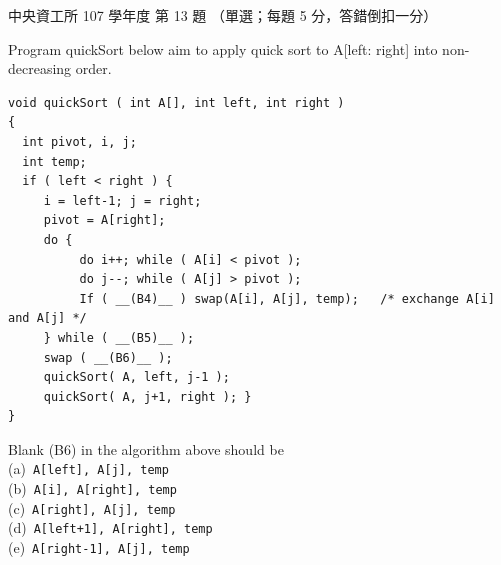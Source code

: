 \begin{pastexam}[label={px:ncu-107-dsa-13}]{中央資工所 107 學年度 第 13 題}
（單選；每題 5 分，答錯倒扣一分）

Program quickSort below aim to apply quick sort to A[left: right] into non-decreasing order.
\begin{verbatim}
void quickSort ( int A[], int left, int right )
{
  int pivot, i, j;
  int temp;
  if ( left < right ) {
     i = left-1; j = right;
     pivot = A[right];
     do {
          do i++; while ( A[i] < pivot );
          do j--; while ( A[j] > pivot );
          If ( __(B4)__ ) swap(A[i], A[j], temp);   /* exchange A[i] and A[j] */
     } while ( __(B5)__ );
     swap ( __(B6)__ );
     quickSort( A, left, j-1 );
     quickSort( A, j+1, right ); }
}
\end{verbatim}

Blank (B6) in the algorithm above should be\\
(a)~\texttt{A[left], A[j], temp}\\
(b)~\texttt{A[i], A[right], temp}\\
(c)~\texttt{A[right], A[j], temp}\\
(d)~\texttt{A[left+1], A[right], temp}\\
(e)~\texttt{A[right-1], A[j], temp}
\end{pastexam}

